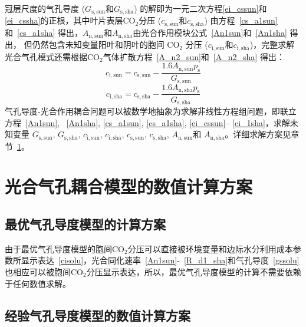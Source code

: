 冠层尺度的气孔导度 ($G_{\mathrm{s,sun}}$和$G_{\mathrm{s,sha}}$) 的解即为一元二次方程\eqref{ei_cssun}和\eqref{ei_cssha}的正根，其中叶片表层$\mathrm{CO_2}$分压 ($c_{\mathrm{s,sun}}$和$c_{\mathrm{s,sha}}$) 由方程~\eqref{cs_a1sun}和~\eqref{cs_a1sha} 得出，$A_{\mathrm{n,sun}}$和$A_{\mathrm{n,sha}}$由光合作用模块公式~\eqref{An1sun}和~\eqref{An1sha} 得出，
但仍然包含未知变量阳叶和阴叶的胞间 $\mathrm{CO_2}$ 分压 ($c_{\mathrm{i,sun}}$和$c_{\mathrm{i,sha}}$)，完整求解光合气孔模式还需根据$\mathrm{CO_2}$气体扩散方程~\eqref{A_n2_sun}和~\eqref{A_n2_sha} 得出：
\begin{equation}\label{ci_1sun}
c_{\mathrm{i,sun}}=c_{\mathrm{s,sun}}-\frac{1.6 A_{\mathrm{n,sun}} p_{\mathrm{s}}}{G_{\mathrm{s,sun}}}
\end{equation}
\begin{equation}\label{ci_1sha}
c_{\mathrm{i,sha}}=c_{\mathrm{s,sha}}-\frac{1.6 A_{\mathrm{n,sha}} p_{\mathrm{s}}}{G_{\mathrm{s,sha}}}
\end{equation}
气孔导度-光合作用耦合问题可以被数学地抽象为求解非线性方程组问题，即联立方程~\eqref{An1sun}, ~\eqref{An1sha}, \eqref{cs_a1sun}, \eqref{cs_a1sha}, \eqref{ei_cssun}--%
\eqref{ci_1sha}，求解未知变量 $G_{\mathrm{s,sun}}$, $G_{\mathrm{s,sha}}$, $c_{\mathrm{i,sun}}$, $c_{\mathrm{i,sha}}$, $c_{\mathrm{s,sun}}$, $c_{\mathrm{s,sha}}$, $A_{\mathrm{n,sun}}$和 $A_{\mathrm{n,sha}}$。详细求解方案见章节~\ref{光合气孔耦合模型的数值计算方案}。


\section{光合气孔耦合模型的数值计算方案}\label{光合气孔耦合模型的数值计算方案}

\subsection{最优气孔导度模型的计算方案}

由于最优气孔导度模型的胞间$\mathrm {CO_2}$分压可以直接被环境变量和边际水分利用成本参数所显示表达~\eqref{cisolu}，光合同化速率~\eqref{An1sun}-~\eqref{R_d1_sha}和气孔导度~\eqref{gssolu}也相应可以被胞间$\mathrm {CO_2}$分压显示表达，所以，最优气孔导度模型的计算不需要依赖于任何数值求解。

\subsection{经验气孔导度模型的数值计算方案}

